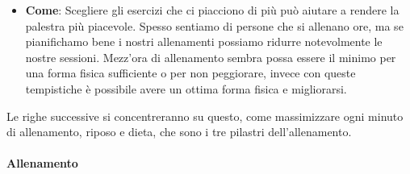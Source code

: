 \documentclass[12pt]{book} %
\begin{document}
\begin{itemize}
\item \textbf{Come}: Scegliere gli esercizi che ci piacciono di più può aiutare a rendere la palestra più piacevole. Spesso sentiamo di persone che si allenano ore, ma se pianifichamo bene i nostri allenamenti possiamo ridurre notevolmente le nostre sessioni. Mezz'ora di allenamento sembra possa essere il minimo per una forma fisica sufficiente o per non peggiorare, invece con queste tempistiche è possibile avere un ottima forma fisica e migliorarsi.
\end{itemize}

Le righe successive si concentreranno su questo, come massimizzare ogni minuto di allenamento, riposo e dieta, che sono i tre pilastri dell'allenamento.

\paragraph{Allenamento}
\end{document}
